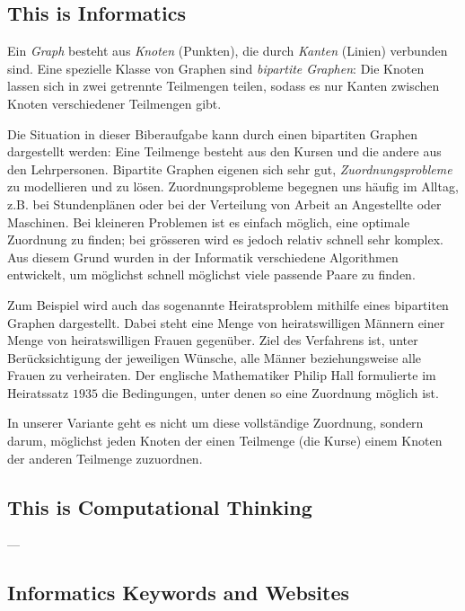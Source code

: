 \documentclass[a4paper,11pt]{report}
\newcommand{\taskGraphicsFolder}{..}
\begin{document}
\subsection*{This is Informatics}

Ein \emph{Graph} besteht aus \emph{Knoten} (Punkten), die durch \emph{Kanten} (Linien) verbunden sind. Eine spezielle Klasse von Graphen sind \emph{bipartite Graphen}: Die Knoten lassen sich in zwei getrennte Teilmengen teilen, sodass es nur Kanten zwischen Knoten verschiedener Teilmengen gibt.

{\centering%
\par}

Die Situation in dieser Biberaufgabe kann durch einen bipartiten Graphen dargestellt werden: Eine Teilmenge besteht aus den Kursen und die andere aus den Lehrpersonen. Bipartite Graphen eigenen sich sehr gut, \emph{Zuordnungsprobleme} zu modellieren und zu lösen. Zuordnungsprobleme begegnen uns häufig im Alltag, z.B. bei Stundenplänen oder bei der Verteilung von Arbeit an Angestellte oder Maschinen. Bei kleineren Problemen ist es einfach möglich, eine optimale Zuordnung zu finden; bei grösseren wird es jedoch relativ schnell sehr komplex. Aus diesem Grund wurden in der Informatik verschiedene Algorithmen entwickelt, um möglichst schnell möglichst viele passende Paare zu finden.

Zum Beispiel wird auch das sogenannte Heiratsproblem mithilfe eines bipartiten Graphen dargestellt. Dabei steht eine Menge von heiratswilligen Männern einer Menge von heiratswilligen Frauen gegenüber. Ziel des Verfahrens ist, unter Berücksichtigung der jeweiligen Wünsche, alle Männer beziehungsweise alle Frauen zu verheiraten. Der englische Mathematiker Philip Hall formulierte im Heiratssatz $1935$ die Bedingungen, unter denen so eine Zuordnung möglich ist.

In unserer Variante geht es nicht um diese vollständige Zuordnung, sondern darum, möglichst jeden Knoten der einen Teilmenge (die Kurse) einem Knoten der anderen Teilmenge zuzuordnen.


\subsection*{This is Computational Thinking}

—


\subsection*{Informatics Keywords and Websites}
\end{document}
